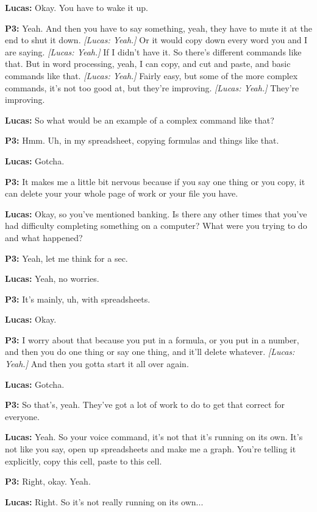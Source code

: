 \textbf{Lucas:} Okay. You have to wake it up. 

\textbf{P3:} Yeah. And then you have to say something, yeah, they have to mute it at the end to shut it down. \textit{[Lucas: Yeah.]} Or it would copy down every word you and I are saying. \textit{[Lucas: Yeah.]} If I didn't have it. So there's different commands like that. But in word processing, yeah, I can copy, and cut and paste, and basic commands like that. \textit{[Lucas: Yeah.]} Fairly easy, but some of the more complex commands, it's not too good at, but they're improving. \textit{[Lucas: Yeah.]} They're improving. 

\textbf{Lucas:} So what would be an example of a complex command like that? 

\textbf{P3:} Hmm. Uh, in my spreadsheet, copying formulas and things like that. 

\textbf{Lucas:} Gotcha. 

\textbf{P3:} It makes me a little bit nervous because if you say one thing or you copy, it can delete your your whole page of work or your file you have. 

\textbf{Lucas:} Okay, so you've mentioned banking. Is there any other times that you've had difficulty completing something on a computer? What were you trying to do and what happened? 

\textbf{P3:} Yeah, let me think for a sec. 

\textbf{Lucas:} Yeah, no worries. 

\textbf{P3:} It's mainly, uh, with spreadsheets. 

\textbf{Lucas:} Okay. 

\textbf{P3:} I worry about that because you put in a formula, or you put in a number, and then you do one thing or say one thing, and it'll delete whatever. \textit{[Lucas: Yeah.]} And then you gotta start it all over again. 

\textbf{Lucas:} Gotcha. 

\textbf{P3:} So that's, yeah. They've got a lot of work to do to get that correct for everyone. 

\textbf{Lucas:} Yeah. So your voice command, it's not that it's running on its own. It's not like you say, open up spreadsheets and make me a graph. You're telling it explicitly, copy this cell, paste to this cell. 

\textbf{P3:} Right, okay. Yeah. 

\textbf{Lucas:} Right. So it's not really running on its own... 

